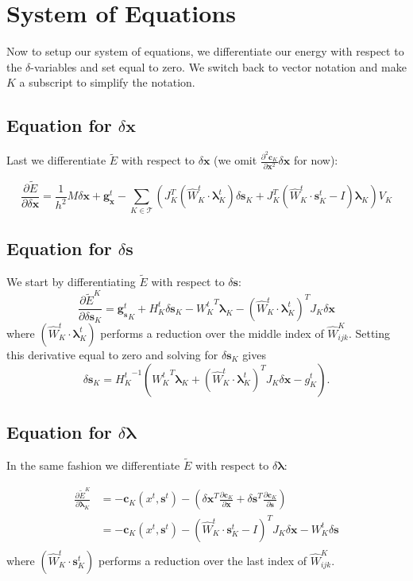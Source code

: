 \documentclass[letterpaper,12pt]{article}
\theoremstyle{remark}
\newcommand{\Th}{\mathcal{T}}
\newcommand{\x}{\mathbf{x}}
\newcommand{\C}{\mathbf{c}}
\newcommand{\s}{\mathbf{s}}
\newcommand{\la}{\mathbf{\lambda}}
\newcommand{\dx}{\delta \x}
\newcommand{\ds}{\delta \s}
\newcommand{\dl}{\delta \la}
\newcommand{\gx}{ {\mathbf{g}_\x^t} }
\newcommand{\gs}{ {\mathbf{g}_\s^t} }
\begin{document}
\section{System of Equations}
Now to setup our system of equations, we differentiate our energy with respect to the $\delta$-variables and set equal to zero. We switch back to vector notation and make $K$ a subscript to simplify the notation.


\subsection{Equation for $\dx$}
Last we differentiate $\tilde{E}$ with respect to $\dx$ (we omit $\frac{\partial^2 \C_K}{ \partial \x^2} \dx$ for now):

\begin{equation}
\frac{\partial \tilde{E}}{\partial \dx} = \frac{1}{h^2}M\dx + \gx 
- \sum_{K \in \Th} \left(
J_K^T(\hat{W}_K^{t}\cdot \la_K^t) \ds_K +
J_K^T(\hat{W}_K^{t}\cdot \s_K^t - I)\la_K
\right)V_K
\end{equation}


\subsection{Equation for $\ds$}
We start by differentiating $\tilde{E}$ with respect to $\ds$:
\begin{equation}
\frac{\partial \tilde{E}^K}{\partial \ds_K} =  \gs_K + H_K^t \ds_K -
{W_K^t}^T \la_K - (\hat{W}_K^{t}\cdot \la_K^t)^T J_K \dx
\end{equation}
where $(\hat{W}_K^{t}\cdot \la_K^t)$ performs a reduction over the middle index of $\hat{W}^K_{ijk}$. Setting this derivative equal to zero and solving for $\ds_K$ gives
\begin{equation}
\ds_K = {H_K^t}^{-1} \left( {W_K^t}^T \la_K + (\hat{W}_K^{t}\cdot \la_K^t)^T J_K \dx - g_K^t \right).
\end{equation}

\subsection{Equation for $\dl$}
In the same fashion we differentiate $\tilde{E}$ with respect to $\dl$:

\begin{equation}
\begin{split}
\frac{\partial \tilde{E}^K}{\partial \la_K} &= -\C_K (x^t,\s^t)- \left( \dx^T 
  \frac{\partial \C_K }{\partial \x} +  \ds^T \frac{\partial \C_K }{\partial \s} \right) \\
  &= -\C_K (x^t,\s^t) -(\hat{W}_K^{t}\cdot \s_K^t - I)^T J_K \dx - W_K^t \ds\\
\end{split}
\end{equation}
where $(\hat{W}_K^{t}\cdot \s_K^t)$ performs a reduction over the last index of $\hat{W}^K_{ijk}$.
\end{document}
